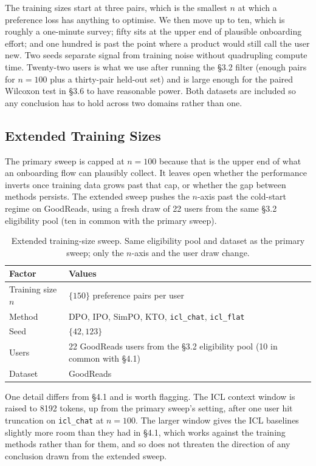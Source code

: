 The training sizes start at three pairs, which is the smallest $n$ at which a preference loss has anything to optimise. We then move up to ten, which is roughly a one-minute survey; fifty sits at the upper end of plausible onboarding effort; and one hundred is past the point where a product would still call the user new. Two seeds separate signal from training noise without quadrupling compute time. Twenty-two users is what we use after running the \S3.2 filter (enough pairs for $n = 100$ plus a thirty-pair held-out set) and is large enough for the paired Wilcoxon test in \S3.6 to have reasonable power. Both datasets are included so any conclusion has to hold across two domains rather than one.


\subsection{Extended Training Sizes}
\label{sec:exp:extended}

The primary sweep is capped at $n = 100$ because that is the upper end of what an onboarding flow can plausibly collect. It leaves open whether the performance inverts once training data grows past that cap, or whether the gap between methods persists. The extended sweep pushes the $n$-axis past the cold-start regime on GoodReads, using a fresh draw of 22 users from the same \S3.2 eligibility pool (ten in common with the primary sweep).

\begin{table}[h]
\centering
\caption{Extended training-size sweep. Same eligibility pool and dataset as the primary sweep; only the $n$-axis and the user draw change.}
\label{tab:extended_grid}
\begin{tabular}{ll}
\toprule
\textbf{Factor} & \textbf{Values} \\
\midrule
Training size $n$ & $\{150\}$ preference pairs per user \\
Method            & DPO, IPO, SimPO, KTO, \texttt{icl\_chat}, \texttt{icl\_flat} \\
Seed              & $\{42, 123\}$ \\
Users             & 22 GoodReads users from the \S3.2 eligibility pool (10 in common with \S4.1) \\
Dataset           & GoodReads \\
\bottomrule
\end{tabular}
\end{table}

One detail differs from \S4.1 and is worth flagging. The ICL context window is raised to 8192 tokens, up from the primary sweep's setting, after one user hit truncation on \texttt{icl\_chat} at $n = 100$. The larger window gives the ICL baselines slightly more room than they had in \S4.1, which works against the training methods rather than for them, and so does not threaten the direction of any conclusion drawn from the extended sweep.


